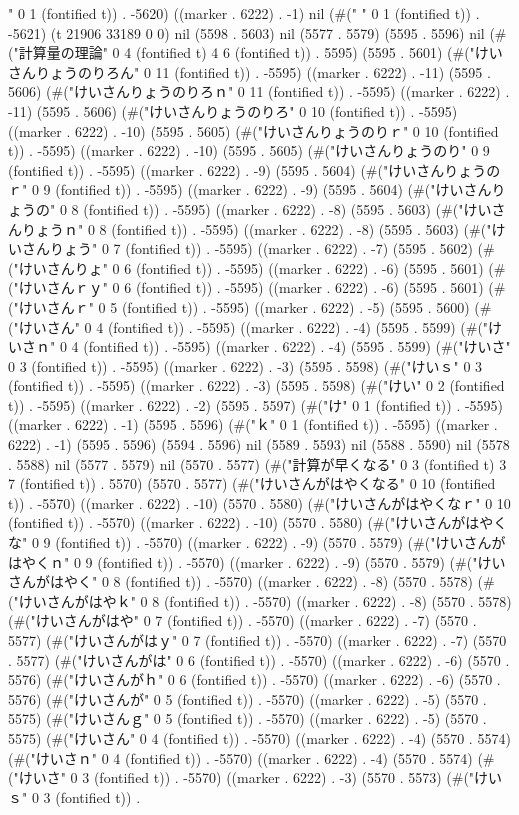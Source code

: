 {" 0 1 (fontified t)) . -5620) ((marker . 6222) . -1) nil (#(" " 0 1 (fontified t)) . -5621) (t 21906 33189 0 0) nil (5598 . 5603) nil (5577 . 5579) (5595 . 5596) nil (#("計算量の理論" 0 4 (fontified t) 4 6 (fontified t)) . 5595) (5595 . 5601) (#("けいさんりょうのりろん" 0 11 (fontified t)) . -5595) ((marker . 6222) . -11) (5595 . 5606) (#("けいさんりょうのりろｎ" 0 11 (fontified t)) . -5595) ((marker . 6222) . -11) (5595 . 5606) (#("けいさんりょうのりろ" 0 10 (fontified t)) . -5595) ((marker . 6222) . -10) (5595 . 5605) (#("けいさんりょうのりｒ" 0 10 (fontified t)) . -5595) ((marker . 6222) . -10) (5595 . 5605) (#("けいさんりょうのり" 0 9 (fontified t)) . -5595) ((marker . 6222) . -9) (5595 . 5604) (#("けいさんりょうのｒ" 0 9 (fontified t)) . -5595) ((marker . 6222) . -9) (5595 . 5604) (#("けいさんりょうの" 0 8 (fontified t)) . -5595) ((marker . 6222) . -8) (5595 . 5603) (#("けいさんりょうｎ" 0 8 (fontified t)) . -5595) ((marker . 6222) . -8) (5595 . 5603) (#("けいさんりょう" 0 7 (fontified t)) . -5595) ((marker . 6222) . -7) (5595 . 5602) (#("けいさんりょ" 0 6 (fontified t)) . -5595) ((marker . 6222) . -6) (5595 . 5601) (#("けいさんｒｙ" 0 6 (fontified t)) . -5595) ((marker . 6222) . -6) (5595 . 5601) (#("けいさんｒ" 0 5 (fontified t)) . -5595) ((marker . 6222) . -5) (5595 . 5600) (#("けいさん" 0 4 (fontified t)) . -5595) ((marker . 6222) . -4) (5595 . 5599) (#("けいさｎ" 0 4 (fontified t)) . -5595) ((marker . 6222) . -4) (5595 . 5599) (#("けいさ" 0 3 (fontified t)) . -5595) ((marker . 6222) . -3) (5595 . 5598) (#("けいｓ" 0 3 (fontified t)) . -5595) ((marker . 6222) . -3) (5595 . 5598) (#("けい" 0 2 (fontified t)) . -5595) ((marker . 6222) . -2) (5595 . 5597) (#("け" 0 1 (fontified t)) . -5595) ((marker . 6222) . -1) (5595 . 5596) (#("ｋ" 0 1 (fontified t)) . -5595) ((marker . 6222) . -1) (5595 . 5596) (5594 . 5596) nil (5589 . 5593) nil (5588 . 5590) nil (5578 . 5588) nil (5577 . 5579) nil (5570 . 5577) (#("計算が早くなる" 0 3 (fontified t) 3 7 (fontified t)) . 5570) (5570 . 5577) (#("けいさんがはやくなる" 0 10 (fontified t)) . -5570) ((marker . 6222) . -10) (5570 . 5580) (#("けいさんがはやくなｒ" 0 10 (fontified t)) . -5570) ((marker . 6222) . -10) (5570 . 5580) (#("けいさんがはやくな" 0 9 (fontified t)) . -5570) ((marker . 6222) . -9) (5570 . 5579) (#("けいさんがはやくｎ" 0 9 (fontified t)) . -5570) ((marker . 6222) . -9) (5570 . 5579) (#("けいさんがはやく" 0 8 (fontified t)) . -5570) ((marker . 6222) . -8) (5570 . 5578) (#("けいさんがはやｋ" 0 8 (fontified t)) . -5570) ((marker . 6222) . -8) (5570 . 5578) (#("けいさんがはや" 0 7 (fontified t)) . -5570) ((marker . 6222) . -7) (5570 . 5577) (#("けいさんがはｙ" 0 7 (fontified t)) . -5570) ((marker . 6222) . -7) (5570 . 5577) (#("けいさんがは" 0 6 (fontified t)) . -5570) ((marker . 6222) . -6) (5570 . 5576) (#("けいさんがｈ" 0 6 (fontified t)) . -5570) ((marker . 6222) . -6) (5570 . 5576) (#("けいさんが" 0 5 (fontified t)) . -5570) ((marker . 6222) . -5) (5570 . 5575) (#("けいさんｇ" 0 5 (fontified t)) . -5570) ((marker . 6222) . -5) (5570 . 5575) (#("けいさん" 0 4 (fontified t)) . -5570) ((marker . 6222) . -4) (5570 . 5574) (#("けいさｎ" 0 4 (fontified t)) . -5570) ((marker . 6222) . -4) (5570 . 5574) (#("けいさ" 0 3 (fontified t)) . -5570) ((marker . 6222) . -3) (5570 . 5573) (#("けいｓ" 0 3 (fontified t)) . }
